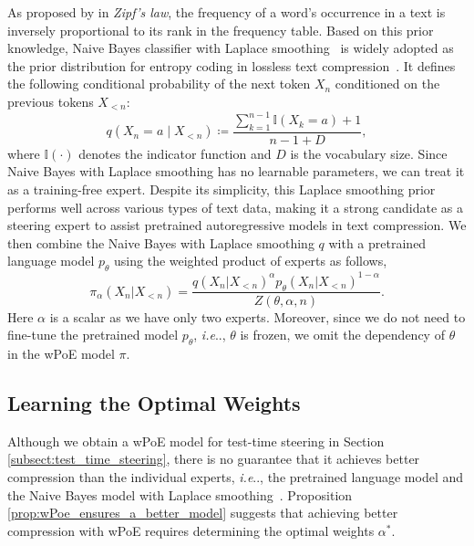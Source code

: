 \documentclass[11pt]{article}
\makeatletter
\DeclareRobustCommand\onedot{\futurelet\@let@token\@onedot}
\def\@onedot{\ifx\@let@token.\else.\null\fi\xspace}
\def\ie{\emph{i.e}\onedot} \def\Ie{\emph{I.e}\onedot}
\makeatother
\begin{document}
As proposed by \citet{zipf1949human} in \textit{Zipf's law}, the frequency of a word's occurrence in a text is inversely proportional to its rank in the frequency table. Based on this prior knowledge, Naive Bayes classifier with Laplace smoothing~\citep{naive_bayes} is widely adopted as the prior distribution for entropy coding in lossless text compression~\cite{Laplace1995}. 
It defines the following conditional probability of the next token $X_n$ conditioned on the previous tokens $X_{<n}$:
\begin{equation}
\label{eq:nb_prob}
q(X_n = a \mid X_{<n}) \coloneqq \frac{\sum_{k=1}^{n-1} \mathbb{I}(X_k = a) + 1}{n - 1 + D},
\end{equation}
where $\mathbb{I}(\cdot)$ denotes the indicator function and $D$ is the vocabulary size. 
Since Naive Bayes with Laplace smoothing has no learnable parameters, we can treat it as a training-free expert.
Despite its simplicity, this Laplace smoothing prior performs well across various types of text data, making it a strong candidate as a steering expert to assist pretrained autoregressive models in text compression. 
We then combine the Naive Bayes with Laplace smoothing $q$ with a pretrained language model $p_{\theta}$ using the weighted product of experts as follows, 
\begin{equation}\label{eq:wpoe_our}
    \pi_{\alpha}\!(X_n \vert X_{<n}) \!= \!
    \frac{q(X_n \vert X_{<n})^{\alpha} p_{\theta}(X_n \vert X_{<n})^{1 - \alpha}}
    {Z(\theta, \alpha, n)}.
\end{equation}
Here $\alpha$ is a scalar as we have only two experts.
Moreover, since we do not need to fine-tune the pretrained model $p_{\theta}$, \ie, $\theta$ is frozen, we omit the dependency of $\theta$ in the wPoE model $\pi$.


\subsection{Learning the Optimal Weights}\label{subsect:optimal_weights}

Although we obtain a wPoE model for test-time steering in Section \ref{subsect:test_time_steering}, there is no guarantee that it achieves better compression than the individual experts, \ie, the pretrained language model and the Naive Bayes model with Laplace smoothing~\citep{naive_bayes}. Proposition \ref{prop:wPoe_ensures_a_better_model} suggests that achieving better compression with wPoE requires determining the optimal weights ${\alpha}^{\ast}$.
\end{document}
